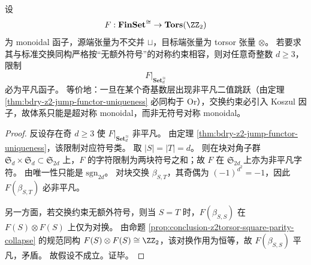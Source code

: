 \begin{theorem}[奇基数非平凡二值跳跃对超对称的结构强迫]\label{thm:conclusion-odd-cardinality-nontrivial-jump-forces-super-symmetry}
设
\[
F:\mathbf{FinSet}^{\cong}\to \mathbf{Tors}(\ZZ_2)
\]
为 monoidal 函子，源端张量为不交并 \(\sqcup\)，目标端张量为 torsor 张量 \(\otimes\)。
若要求其与标准交换同构严格按“无额外符号”的对称约束相容，则对任意奇整数 \(d\ge 3\)，限制
\[
F|_{\mathbf{Set}^{\cong}_d}
\]
必为平凡函子。
等价地：一旦在某个奇基数层出现非平凡二值跳跃（由定理 \ref{thm:bdry-z2-jump-functor-uniqueness} 必同构于 \(\mathrm{Or}\)），交换约束必引入 Koszul 因子，故体系只能是超对称 monoidal，而非无符号对称 monoidal。
\end{theorem}
\begin{proof}
反设存在奇 \(d\ge 3\) 使 \(F|_{\mathbf{Set}^{\cong}_d}\) 非平凡。
由定理 \ref{thm:bdry-z2-jump-functor-uniqueness}，该限制对应符号类。
取 \(|S|=|T|=d\)。
则在块对角子群 \(\mathfrak S_d\times\mathfrak S_d\subset \mathfrak S_{2d}\) 上，\(F\) 的字符限制为两块符号之和；故 \(F\) 在 \(\mathfrak S_{2d}\) 上亦为非平凡字符。
由唯一性只能是 \(\mathrm{sgn}_{2d}\)。
对块交换 \(\beta_{S,T}\)，其奇偶为 \((-1)^{d^2}=-1\)，因此 \(F(\beta_{S,T})\) 必非平凡。

另一方面，若交换约束无额外符号，则当 \(S=T\) 时，\(F(\beta_{S,S})\) 在
\(
F(S)\otimes F(S)
\)
上仅为对换。
由命题 \ref{prop:conclusion-z2torsor-square-parity-collapse} 的规范同构
\(
F(S)\otimes F(S)\cong \ZZ_2
\)，该对换作用为恒等，故 \(F(\beta_{S,S})\) 平凡，矛盾。
故假设不成立。证毕。
\end{proof}


